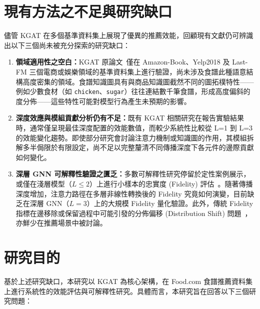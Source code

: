 \section{現有方法之不足與研究缺口}

儘管 KGAT 在多個基準資料集上展現了優異的推薦效能，回顧現有文獻仍可辨識出以下三個尚未被充分探索的研究缺口：

\begin{enumerate}[leftmargin=2em]
  \item \textbf{領域適用性之空白：}KGAT 原論文~\cite{wang2019kgat}僅在 Amazon-Book、Yelp2018 及 Last-FM 三個電商或娛樂領域的基準資料集上進行驗證，尚未涉及食譜此種語意結構高度密集的領域。食譜知識圖具有與商品知識圖截然不同的圖拓樸特性——例如少數食材（如 \texttt{chicken}、\texttt{sugar}）往往連結數千筆食譜，形成高度偏斜的度分佈——這些特性可能對模型行為產生未預期的影響。


  \item \textbf{深度效應與模組貢獻分析仍有不足：}既有 KGAT 相關研究在報告實驗結果時，通常僅呈現最佳深度配置的效能數值，而較少系統性比較從 L=1 到 L=3 的效能變化趨勢。即使部分研究會討論注意力機制或知識圖的作用，其模組拆解多半侷限於有限設定，尚不足以完整釐清不同傳播深度下各元件的邊際貢獻如何變化。

  \item \textbf{深層 GNN 可解釋性驗證之匱乏：}多數可解釋性研究停留於定性案例展示，或僅在淺層模型（$L \leq 2$）上進行小樣本的忠實度 (Fidelity) 評估~\cite{yuan2022explainability}。隨著傳播深度增加，注意力路徑在多層非線性轉換後的 Fidelity 究竟如何演變，目前缺乏在深層 GNN（$L{=}3$）上的大規模 Fidelity 量化驗證。此外，傳統 Fidelity 指標在邊移除或保留過程中可能引發的分佈偏移 (Distribution Shift) 問題~\cite{agarwal2024fidelity}，亦鮮少在推薦場景中被討論。
\end{enumerate}

\section{研究目的}

基於上述研究缺口，本研究以 KGAT 為核心架構，在 Food.com 食譜推薦資料集上進行系統性的效能評估與可解釋性研究。具體而言，本研究旨在回答以下三個研究問題：

